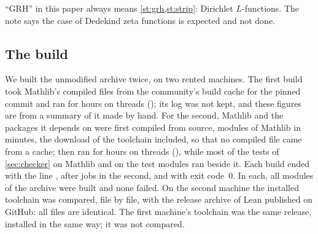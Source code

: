 ``GRH'' in this paper always means \cref{st:grh,st:strip}: Dirichlet $L$-functions. The note
says the case of Dedekind zeta functions is expected and not done.

\subsection{The build}\label{sec:build}
\ifsecondrun
We built the unmodified archive twice, on two rented machines. The first build took
Mathlib's compiled files from the community's build cache for the pinned commit and ran
 for \firstbuildhours{} hours on \firstbuildthreads{} threads
(\firstbuildcpu); its log was not kept, and these figures are from a summary of it made by
hand. For the second, Mathlib and the packages it depends on were first compiled from
source, \mathlibmodules{} modules of Mathlib in \mathlibminutes{} minutes, the download of
the toolchain included, so that no compiled file came from a cache; 
then ran for \buildhours{} hours on \buildthreads{} threads (\buildcpu), while most of the
tests of \cref{sec:checker} on Mathlib and on the test modules ran beside it. Each build ended with
the line , after \buildjobs{} jobs in the second, and
with exit code~$0$. In each, all \filecount{} modules of the archive were built and none
failed. On the second machine the installed toolchain was compared, file by file, with the
release archive of Lean \leanversion{} published on GitHub: all \toolchainfiles{} files are
identical. The first machine's toolchain was the same release, installed in the same way;
it was not compared.

